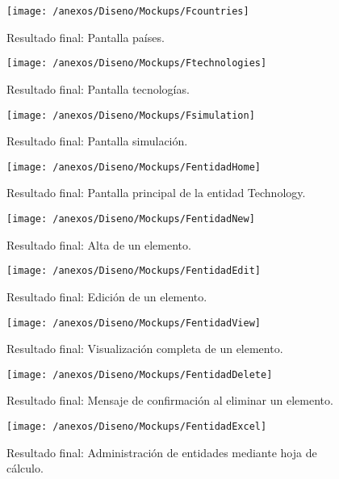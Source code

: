 \begin{figure}[h]
	\centering
	\texttt{[image: /anexos/Diseno/Mockups/Fcountries]}
	\caption{Resultado final: Pantalla países.}
	\label{img:Fcountries}
\end{figure}

\begin{figure}[h]
	\centering
	\texttt{[image: /anexos/Diseno/Mockups/Ftechnologies]}
	\caption{Resultado final: Pantalla tecnologías.}
	\label{img:Ftechnologies}
\end{figure}

\begin{figure}[h]
	\centering
	\texttt{[image: /anexos/Diseno/Mockups/Fsimulation]}
	\caption{Resultado final: Pantalla simulación.}
	\label{img:Fsimulation}
\end{figure}

\begin{figure}[h]
	\centering
	\texttt{[image: /anexos/Diseno/Mockups/FentidadHome]}
	\caption{Resultado final: Pantalla principal de la entidad Technology.}
	\label{img:FentidadHome}
\end{figure}

\begin{figure}[h]
	\centering
	\texttt{[image: /anexos/Diseno/Mockups/FentidadNew]}
	\caption{Resultado final: Alta de un elemento.}
	\label{img:FentidadNew}
\end{figure}

\begin{figure}[h]
	\centering
	\texttt{[image: /anexos/Diseno/Mockups/FentidadEdit]}
	\caption{Resultado final: Edición de un elemento.}
	\label{img:FentidadEdit}
\end{figure}

\begin{figure}[h]
	\centering
	\texttt{[image: /anexos/Diseno/Mockups/FentidadView]}
	\caption{Resultado final: Visualización completa de un elemento.}
	\label{img:FentidadView}
\end{figure}

\begin{figure}[h]
	\centering
	\texttt{[image: /anexos/Diseno/Mockups/FentidadDelete]}
	\caption{Resultado final: Mensaje de confirmación al eliminar un elemento.}
	\label{img:FentidadDelete}
\end{figure}

\begin{figure}[h]
	\centering
	\texttt{[image: /anexos/Diseno/Mockups/FentidadExcel]}
	\caption{Resultado final: Administración de entidades mediante hoja de cálculo.}
	\label{img:FentidadExcel}
\end{figure}

